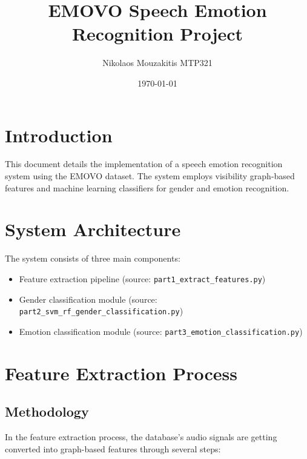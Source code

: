 \documentclass{article}
\title{EMOVO Speech Emotion Recognition Project}
\author{Nikolaos Mouzakitis MTP321}
\date{\today}
\begin{document}
\maketitle

\section{Introduction}
This document details the implementation of a speech emotion recognition system using the EMOVO dataset. 
The system employs
visibility graph-based features and machine learning classifiers for gender and emotion recognition.

\section{System Architecture}
The system consists of three main components:
\begin{itemize}
	\item Feature extraction pipeline (source: \texttt{part1\_extract\_features.py})
	\item Gender classification module (source: \texttt{part2\_svm\_rf\_gender\_classification.py})
	\item Emotion classification module (source: \texttt{part3\_emotion\_classification.py})
\end{itemize}

\section{Feature Extraction Process}
\subsection{Methodology}
In the feature extraction process, the database's audio signals are getting converted
into graph-based features through several steps:
\end{document}
